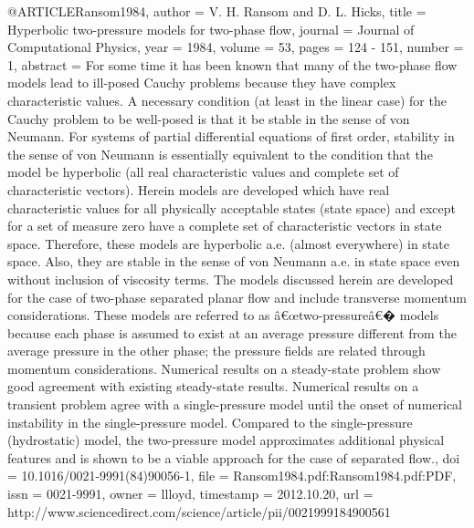 {{@ARTICLE{Ransom1984,
  author = {V. H. Ransom and D. L. Hicks},
  title = {Hyperbolic two-pressure models for two-phase flow},
  journal = {Journal of Computational Physics},
  year = {1984},
  volume = {53},
  pages = {124 - 151},
  number = {1},
  abstract = {For some time it has been known that many of the two-phase flow models
	lead to ill-posed Cauchy problems because they have complex characteristic
	values. A necessary condition (at least in the linear case) for the
	Cauchy problem to be well-posed is that it be stable in the sense
	of von Neumann. For systems of partial differential equations of
	first order, stability in the sense of von Neumann is essentially
	equivalent to the condition that the model be hyperbolic (all real
	characteristic values and complete set of characteristic vectors).
	Herein models are developed which have real characteristic values
	for all physically acceptable states (state space) and except for
	a set of measure zero have a complete set of characteristic vectors
	in state space. Therefore, these models are hyperbolic a.e. (almost
	everywhere) in state space. Also, they are stable in the sense of
	von Neumann a.e. in state space even without inclusion of viscosity
	terms. The models discussed herein are developed for the case of
	two-phase separated planar flow and include transverse momentum considerations.
	These models are referred to as â€œtwo-pressureâ€� models because
	each phase is assumed to exist at an average pressure different from
	the average pressure in the other phase; the pressure fields are
	related through momentum considerations. Numerical results on a steady-state
	problem show good agreement with existing steady-state results. Numerical
	results on a transient problem agree with a single-pressure model
	until the onset of numerical instability in the single-pressure model.
	Compared to the single-pressure (hydrostatic) model, the two-pressure
	model approximates additional physical features and is shown to be
	a viable approach for the case of separated flow.},
  doi = {10.1016/0021-9991(84)90056-1},
  file = {Ransom1984.pdf:Ransom1984.pdf:PDF},
  issn = {0021-9991},
  owner = {llloyd},
  timestamp = {2012.10.20},
  url = {http://www.sciencedirect.com/science/article/pii/0021999184900561}
}

}}
